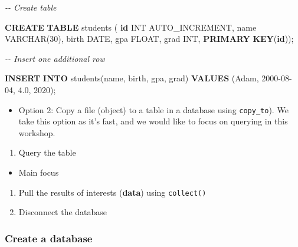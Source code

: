 \documentclass[
]{book}
\newenvironment{Shaded}{\begin{snugshade}}{\end{snugshade}}
\newcommand{\CommentTok}[1]{\textcolor[rgb]{0.56,0.35,0.01}{\textit{#1}}}
\newcommand{\DataTypeTok}[1]{\textcolor[rgb]{0.13,0.29,0.53}{#1}}
\newcommand{\DecValTok}[1]{\textcolor[rgb]{0.00,0.00,0.81}{#1}}
\newcommand{\FloatTok}[1]{\textcolor[rgb]{0.00,0.00,0.81}{#1}}
\newcommand{\KeywordTok}[1]{\textcolor[rgb]{0.13,0.29,0.53}{\textbf{#1}}}
\newcommand{\NormalTok}[1]{#1}
\newcommand{\StringTok}[1]{\textcolor[rgb]{0.31,0.60,0.02}{#1}}
\providecommand{\tightlist}{%
  \setlength{\itemsep}{0pt}\setlength{\parskip}{0pt}}
\begin{document}
\begin{Shaded}
\begin{Highlighting}[]

\CommentTok{{-}{-} Create table }

\KeywordTok{CREATE} \KeywordTok{TABLE}\NormalTok{ students (}
    \KeywordTok{id} \DataTypeTok{INT}\NormalTok{ AUTO\_INCREMENT,}
\NormalTok{    name }\DataTypeTok{VARCHAR}\NormalTok{(}\DecValTok{30}\NormalTok{),}
\NormalTok{    birth }\DataTypeTok{DATE}\NormalTok{,}
\NormalTok{    gpa }\DataTypeTok{FLOAT}\NormalTok{,}
\NormalTok{    grad }\DataTypeTok{INT}\NormalTok{,}
    \KeywordTok{PRIMARY} \KeywordTok{KEY}\NormalTok{(}\KeywordTok{id}\NormalTok{));}

\CommentTok{{-}{-} Insert one additional row }

\KeywordTok{INSERT} \KeywordTok{INTO}\NormalTok{ students(name, birth, gpa, grad)}
      \KeywordTok{VALUES}\NormalTok{ (}\StringTok{\textquotesingle{}Adam\textquotesingle{}}\NormalTok{, }\StringTok{\textquotesingle{}2000{-}08{-}04\textquotesingle{}}\NormalTok{, }\FloatTok{4.0}\NormalTok{, }\DecValTok{2020}\NormalTok{);}
\end{Highlighting}
\end{Shaded}

\begin{itemize}
\tightlist
\item
  Option 2: Copy a file (object) to a table in a database using \texttt{copy\_to}). We take this option as it's fast, and we would like to focus on querying in this workshop.
\end{itemize}

\begin{enumerate}
\def\labelenumi{\arabic{enumi}.}
\setcounter{enumi}{2}
\tightlist
\item
  Query the table
\end{enumerate}

\begin{itemize}
\tightlist
\item
  Main focus
\end{itemize}

\begin{enumerate}
\def\labelenumi{\arabic{enumi}.}
\setcounter{enumi}{3}
\item
  Pull the results of interests (\textbf{data}) using \texttt{collect()}
\item
  Disconnect the database
\end{enumerate}

\hypertarget{create-a-database}{%
\subsubsection{Create a database}\label{create-a-database}}
\end{document}
